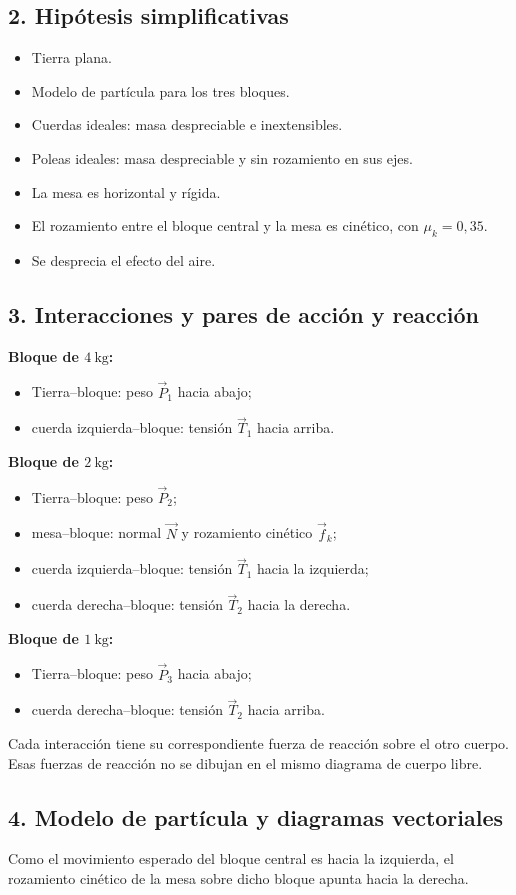 \documentclass[12pt]{article}
\newcommand{\paso}[2]{%
  \subsection*{\color{AzulFisica}#1. #2}%
}
\begin{document}
\paso{2}{Hipótesis simplificativas}
\begin{itemize}[itemsep=2pt]
  \item Tierra plana.
  \item Modelo de partícula para los tres bloques.
  \item Cuerdas ideales: masa despreciable e inextensibles.
  \item Poleas ideales: masa despreciable y sin rozamiento en sus ejes.
  \item La mesa es horizontal y rígida.
  \item El rozamiento entre el bloque central y la mesa es cinético, con $\mu_k=0,35$.
  \item Se desprecia el efecto del aire.
\end{itemize}

\paso{3}{Interacciones y pares de acción y reacción}
\textbf{Bloque de $\SI{4}{\kilogram}$:}
\begin{itemize}[itemsep=2pt]
  \item Tierra--bloque: peso $\vec P_1$ hacia abajo;
  \item cuerda izquierda--bloque: tensión $\vec T_1$ hacia arriba.
\end{itemize}

\textbf{Bloque de $\SI{2}{\kilogram}$:}
\begin{itemize}[itemsep=2pt]
  \item Tierra--bloque: peso $\vec P_2$;
  \item mesa--bloque: normal $\vec N$ y rozamiento cinético $\vec f_k$;
  \item cuerda izquierda--bloque: tensión $\vec T_1$ hacia la izquierda;
  \item cuerda derecha--bloque: tensión $\vec T_2$ hacia la derecha.
\end{itemize}

\textbf{Bloque de $\SI{1}{\kilogram}$:}
\begin{itemize}[itemsep=2pt]
  \item Tierra--bloque: peso $\vec P_3$ hacia abajo;
  \item cuerda derecha--bloque: tensión $\vec T_2$ hacia arriba.
\end{itemize}

Cada interacción tiene su correspondiente fuerza de reacción sobre el otro cuerpo. Esas fuerzas de reacción no se dibujan en el mismo diagrama de cuerpo libre.

\paso{4}{Modelo de partícula y diagramas vectoriales}
Como el movimiento esperado del bloque central es hacia la izquierda, el rozamiento cinético de la mesa sobre dicho bloque apunta hacia la derecha.
\end{document}
